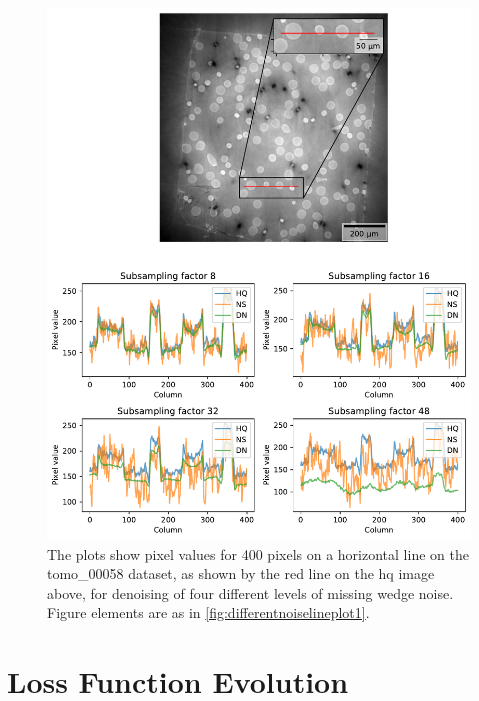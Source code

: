 \begin{figure}[htbp]
  \centering
  \includegraphics[width=.95\textwidth]{figures/differentnoiselineplot2.pdf}
  \caption[Line plot of denoising of different levels of noise on tomo\_00058]{The plots show pixel values for 400 pixels on a horizontal line on the tomo\_00058 dataset, as shown by the red line on the \acrshort{hq} image above, for denoising of four different levels of missing wedge noise. Figure elements are as in \cref{fig:differentnoiselineplot1}. }
  \label{fig:differentnoiselineplot2}
\end{figure}

\section{Loss Function Evolution}


